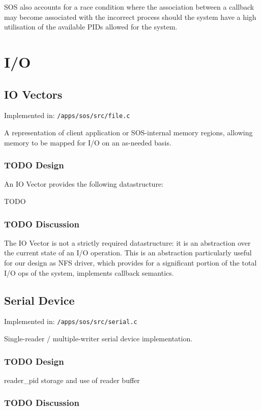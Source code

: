 \documentclass[a4paper,12pt]{article}
\begin{document}
SOS also accounts for a race condition where the association between a
callback may become associated with the incorrect process should the system
have a high utilisation of the available PIDs allowed for the system.

\section{I/O}
\subsection{IO Vectors}
Implemented in: \texttt{/apps/sos/src/file.c}

A representation of client application or SOS-internal memory regions,
allowing memory to be mapped for I/O on an as-needed basis.

\subsubsection{TODO Design}
An IO Vector provides the following datastructure:

TODO

\subsubsection{TODO Discussion}
The IO Vector is not a strictly required datastructure: it is an abstraction
over the current state of an I/O operation.  This is an abstraction
particularly useful for our design as NFS driver, which provides for a
significant portion of the total I/O ops of the system, implements callback
semantics.

\subsection{Serial Device}
Implemented in: \texttt{/apps/sos/src/serial.c}

Single-reader / multiple-writer serial device implementation.

\subsubsection{TODO Design}
reader\_pid
storage and use of reader buffer

\subsubsection{TODO Discussion}
\end{document}
